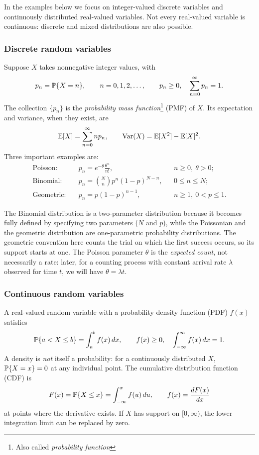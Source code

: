 In the examples below we focus on integer-valued discrete variables and continuously distributed real-valued variables. Not every real-valued variable is continuous: discrete and mixed distributions are also possible.

\subsubsection{Discrete random variables}
Suppose $X$ takes nonnegative integer values, with
\begin{equation}
 p_n={\mathbb P}\{X=n\},\qquad n=0,1,2,\ldots,\qquad
 p_n\geq 0,\quad \sum_{n=0}^{\infty}p_n=1.
 \label{eq:basic_discrete}
\end{equation}
The collection $\{p_n\}$ is the \emph{probability mass function}\footnote{Also called {\em probability function}} (PMF) of $X$. Its expectation and variance, when they exist, are
\begin{equation}
 {\mathbb E}[X]=\sum_{n=0}^{\infty}np_n,\qquad
 \operatorname{Var}(X)={\mathbb E}[X^2]-{\mathbb E}[X]^2.
 \label{eq:basic_moments}
\end{equation}
Three important examples are:
\begin{align}
 \text{Poisson:}\quad &p_n=e^{-\theta}\frac{\theta^n}{n!}, &&n\geq 0,\ \theta>0;\label{eq:basic_poisson}\\
 \text{Binomial:}\quad &p_n=\binom{N}{n}p^n(1-p)^{N-n}, &&0\leq n\leq N;\\
 \text{Geometric:}\quad &p_n=p(1-p)^{n-1}, &&n\geq 1,\ 0<p\leq1.
 \label{eq:basic_geometric}
\end{align}

The Binomial distribution is a two-parameter distribution because it becomes fully defined by specifying two parameters ($N$ and $p$), while the Poissonian and the geometric distribution are one-parametric probability distributions. The geometric convention here counts the trial on which the first success occurs, so its support starts at one. The Poisson parameter $\theta$ is the \emph{expected count}, not necessarily a rate: later, for a counting process with constant arrival rate $\lambda$ observed for time $t$, we will have $\theta=\lambda t$.

\subsubsection{Continuous random variables}
A real-valued random variable with a probability density function (PDF) $f(x)$ satisfies
\begin{equation}
 {\mathbb P}\{a<X\leq b\}=\int_a^b f(x)\,dx,\qquad
 f(x)\geq0,\quad\int_{-\infty}^{\infty}f(x)\,dx=1.
\end{equation}
A density is \emph{not} itself a probability: for a continuously distributed $X$, ${\mathbb P}\{X=x\}=0$ at any individual point. The cumulative distribution function (CDF) is
\begin{equation}
 F(x)={\mathbb P}\{X\leq x\}=\int_{-\infty}^{x}f(u)\,du,
 \qquad f(x)=\frac{dF(x)}{dx}
 \label{eq:basic_cdf}
\end{equation}
at points where the derivative exists. If $X$ has support on $[0,\infty)$, the lower integration limit can be replaced by zero.

